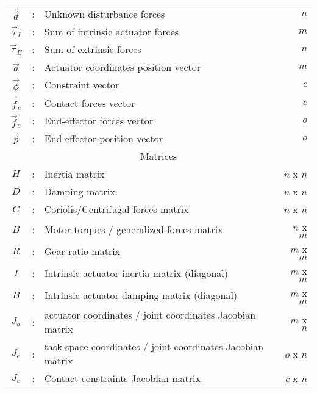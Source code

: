 \begin{table}[htbp]
\begin{tabular}{ c c l r }
			$\vec{d}$       &  :  & Unknown disturbance forces                                 & $n$  \\
			$\vec{\tau}_I$  &  :  & Sum of intrinsic actuator forces                           & $m$  \\
			$\vec{\tau}_E$  &  :  & Sum of extrinsic forces                                    & $n$  \\
			$\vec{a}$       &  :  & Actuator coordinates position vector                       & $m$  \\
			$\vec{\phi}$    &  :  & Constraint vector                                          & $c$  \\
			$\vec{f}_c$     &  :  & Contact forces vector                                      & $c$  \\
			$\vec{f}_e$     &  :  & End-effector forces vector                                 & $o$  \\
			$\vec{p}$       &  :  & End-effector position vector                               & $o$  \\
			\hline \hline
			\multicolumn{4}{c}{Matrices} \\
			\hline \hline
			$H$             &  :  & Inertia matrix                                             & $n$ x $n$ \\
			$D$             &  :  & Damping matrix                                             & $n$ x $n$ \\
			$C$             &  :  & Coriolis/Centrifugal forces matrix                         & $n$ x $n$ \\
			$B$             &  :  & Motor torques / generalized forces matrix                  & $n$ x $m$ \\
			$R$             &  :  & Gear-ratio matrix                                          & $m$ x $m$ \\
			$I$             &  :  & Intrinsic actuator inertia matrix (diagonal)               & $m$ x $m$ \\
			$B$             &  :  & Intrinsic actuator damping matrix (diagonal)               & $m$ x $m$ \\
			$J_a$           &  :  & actuator coordinates / joint coordinates Jacobian matrix   & $m$ x $n$ \\
			$J_e$           &  :  & task-space coordinates / joint coordinates Jacobian matrix & $o$ x $n$ \\
			$J_c$           &  :  & Contact constraints Jacobian matrix                        & $c$ x $n$ \\ 
		\hline \hline
        \end{tabular}		
	\label{tab:nom}
\end{table}

